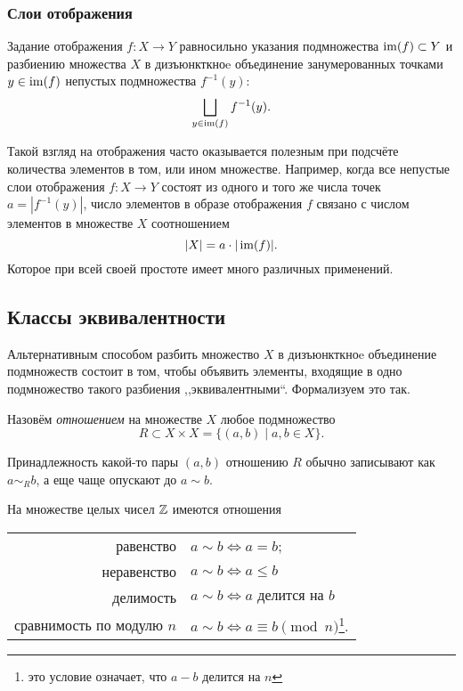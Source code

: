 \subsubsection{Слои отображения}
Задание отображения $f \colon X \to Y$ равносильно указания подмножества $\operatorname{im}(f) \subset Y$ и разбиению множества $X$ в дизъюнкткноe объединение занумерованных точками $y \in \operatorname{im}(f)$ непустых подмножества $f^{-1}(y)$:
\[
    \bigsqcup_{y \in \operatorname{im} (f)}f^{-1}(y).
\]

Такой взгляд на отображения часто оказывается полезным при подсчёте количества элементов в том, или ином множестве. Например, когда все непустые слои отображения $f \colon X \to Y$ состоят из одного и того же числа точек $a = |f^{-1}(y)|$, число элементов в образе отображения $f$ связано с числом элементов в множестве $X$ соотношением \[ |X| = a \cdot |\operatorname{im}(f) |.\]
Которое при всей своей простоте имеет много различных применений.

\subsection{Классы эквивалентности}
Альтернативным способом разбить множество $X$ в дизъюнкткноe объединение подмножеств состоит в том, чтобы объявить элементы, входящие в одно подмножество такого разбиения ,,эквивалентными``. Формализуем это так. 
\begin{definition}
    Назовём \emph{отношением} на множестве $X$ любое подмножество \[R \subset X\times X = \{(a, b)\mid a, b \in X\}.\]
\end{definition}

Принадлежность какой-то пары $(a, b)$ отношению $R$ обычно записывают как $a \sim_R b$, а еще чаще опускают до $a \sim b$.
\begin{example}
    На множестве целых чисел $\mathbb Z$ имеются отношения 
    \begin{center}
        \begin{tabular}{r l}
            равенство & $a \sim b \iff a =b $; \\
            неравенство & $a \sim b \iff a \leqslant b$ \\
            делимость & $a \sim b \iff a \text{ делится на } b$ \\
            сравнимость по модулю $n$ & $a \sim b \iff a \equiv b \pmod n$\footnote{это условие означает, что $a-b$ делится на $n$}.
        \end{tabular}
    \end{center}
\end{example}

